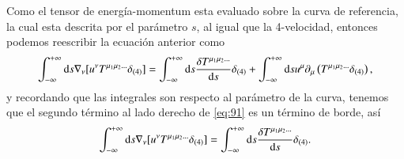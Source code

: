 Como el tensor de energ\'ia-momentum esta evaluado sobre la curva de referencia, la cual esta descrita por el parámetro $s$, al igual que la 4-velocidad, entonces podemos reescribir la ecuaci\'on anterior como
\begin{equation}
\label{eq:91}
\int_{-\infty}^{+\infty} \mathrm{d}s \nabla_{\nu} [u^{\nu} T^{\mu_1 \mu_2 \dots} \delta_{(4)}] = \int_{-\infty}^{+\infty} \mathrm{d}s \frac{\delta T^{\mu_1 \mu_2 \dots}}{\mathrm{d}s} \delta_{(4)} + \int_{-\infty}^{+\infty} \mathrm{d}s u^{\mu}  \partial_{\mu} \left( T^{\mu_1 \mu_2 \dots} \delta_{(4)} \right),
\end{equation}
y recordando que las integrales son respecto al par\'ametro de la curva, tenemos que el segundo t\'ermino al lado derecho de \eqref{eq:91} es un t\'ermino de borde, as\'i
\begin{equation}
\int_{-\infty}^{+\infty} \mathrm{d}s \nabla_{\nu} [u^{\nu} T^{\mu_1 \mu_2 \dots} \delta_{(4)}] = \int_{-\infty}^{+\infty} \mathrm{d}s \frac{\delta T^{\mu_1 \mu_2 \dots}}{\mathrm{d}s} \delta_{(4)}.
\end{equation}